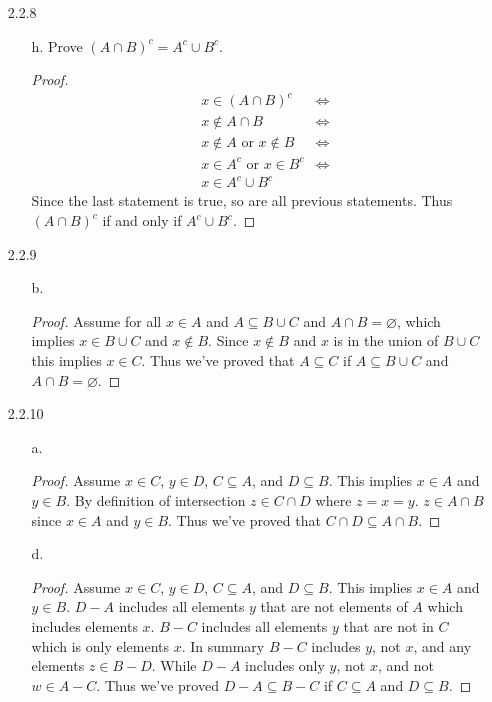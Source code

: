 \documentclass[11pt]{amsart}
\theoremstyle{definition}
\begin{document}
\begin{itemize}
\begin{itemize}
\end{itemize}

\item[2.2.8] 
\begin{itemize}
    \item[h.] Prove $(A\cap B)^c=A^c\cup B^c$.
    \begin{proof}
        \begin{align*}
            &x\in(A\cap B)^c &\iff \\
            &x\notin A\cap B &\iff \\
            &x\notin A\text{ or }x\notin B &\iff \\
            &x\in A^c\text{ or }x\in B^c &\iff \\
            &x\in A^c\cup B^c
        \end{align*}
        Since the last statement is true, so are all previous statements. Thus $(A\cap B)^c$ if and only if $A^c\cup B^c$.
    \end{proof}

\end{itemize}

\item[2.2.9]
\begin{itemize}
    \item[b.] \begin{proof}
        Assume for all $x\in A$ and $A\subseteq B\cup C$ and $A\cap B=\varnothing$, which implies $x\in B\cup C$ and $x\notin B$. Since $x\notin B$ and $x$ is in the union of $B\cup C$ this implies $x\in C$. Thus we've proved that $A\subseteq C$ if $A\subseteq B\cup C$ and $A\cap B=\varnothing$.
    \end{proof}

\end{itemize}

\item[2.2.10]
\begin{itemize}
    \item[a.] \begin{proof}
        Assume $x\in C$, $y\in D$, $C\subseteq A$, and $D\subseteq B$. This implies $x\in A$ and $y\in B$. By definition of intersection $z\in C\cap D$ where $z=x=y$. $z\in A\cap B$ since $x\in A$ and $y\in B$. Thus we've proved that $C\cap D\subseteq A\cap B$.
    \end{proof}

    \item[d.] \begin{proof}
        Assume $x\in C$, $y\in D$, $C\subseteq A$, and $D\subseteq B$. This implies $x\in A$ and $y\in B$. $D-A$ includes all elements $y$ that are not elements of $A$ which includes elements $x$. $B-C$ includes all elements $y$ that are not in $C$ which is only elements $x$. In summary $B-C$ includes $y$, not $x$, and any elements $z\in B-D$. While $D-A$ includes only $y$, not $x$, and not $w\in A-C$. Thus we've proved $D-A\subseteq B-C$ if $C\subseteq A$ and $D\subseteq B$.
    \end{proof}


\end{itemize}
\end{itemize}
\end{document}
